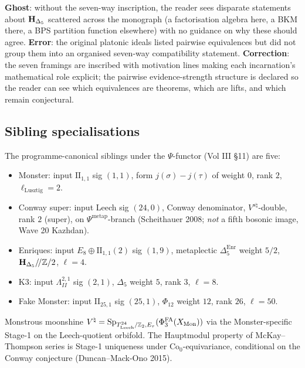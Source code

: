 \textbf{Ghost}: without the seven-way inscription, the reader sees
disparate statements about $\mathbf{H}_{\Delta_5}$ scattered across the
monograph (a factorisation algebra here, a BKM there, a BPS partition
function elsewhere) with no guidance on why these should agree.
\textbf{Error}: the original platonic ideals listed pairwise
equivalences but did not group them into an organised seven-way
compatibility statement. \textbf{Correction}: the seven framings are
inscribed with motivation lines making each incarnation's
mathematical role explicit; the pairwise evidence-strength structure
is declared so the reader can see which equivalences are theorems,
which are lifts, and which remain conjectural.

\subsection{Sibling specialisations}
\label{wn:subsec:healed-siblings-by-d}

\begin{conjecture}
\label{wn:conj:healed-siblings-psi}
The programme-canonical siblings under the $\Psi$-functor (Vol III \S11) are five:
\begin{itemize}
\item Monster: input $\mathrm{II}_{1, 1}$ sig $(1, 1)$, form $j(\sigma) - j(\tau)$ of weight $0$, rank $2$, $\ell_{\mathrm{Lusztig}} = 2$.
\item Conway super: input Leech sig $(24, 0)$, Conway denominator, $V^{s\natural}$-double, rank $2$ (super), on $\Psi^{\mathrm{metap}}$-branch (Scheithauer 2008; \emph{not} a fifth bosonic image, Wave 20 Kazhdan).
\item Enriques: input $E_8 \oplus \mathrm{II}_{1, 1}(2)$ sig $(1, 9)$, metaplectic $\Delta_5^{\mathrm{Enr}}$ weight $5/2$, $\mathbf H_{\Delta_5}/\!/\mathbb{Z}/2$, $\ell = 4$.
\item K3: input $\Lambda^{2, 1}_{II}$ sig $(2, 1)$, $\Delta_5$ weight $5$, rank $3$, $\ell = 8$.
\item Fake Monster: input $\mathrm{II}_{25, 1}$ sig $(25, 1)$, $\Phi_{12}$ weight $12$, rank $26$, $\ell = 50$.
\end{itemize}
Monstrous moonshine $V^\natural = \mathrm{Sp}_{T^{24}_{\mathrm{Leech}}/\mathbb{Z}_2, E_\tau}(\Phi^{\mathrm{FA}}_3(X_{\mathrm{Mon}}))$ via the Monster-specific Stage-1 on the Leech-quotient orbifold. The Hauptmodul property of McKay--Thompson series is Stage-1 uniqueness under $\mathrm{Co}_0$-equivariance, conditional on the Conway conjecture (Duncan--Mack-Ono 2015).
\end{conjecture}

